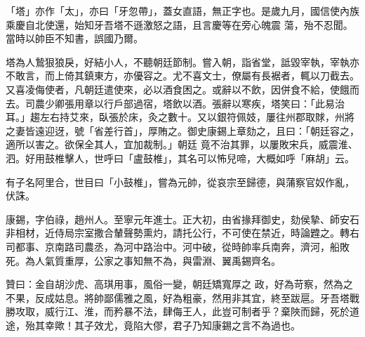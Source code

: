 \begin{pinyinscope}
 「塔」亦作「太」，亦曰「牙忽帶」，蓋女直語，無正字也。是歲九月，國信使內族乘慶自北使還，始知牙吾塔不遜激怒之語，且言慶等在旁心魄震
 蕩，殆不忍聞。當時以帥臣不知書，誤國乃爾。



 塔為人鷙狠狼戾，好結小人，不聽朝廷節制。嘗入朝，詣省堂，詆毀宰執，宰執亦不敢言，而上倚其鎮東方，亦優容之。尤不喜文士，僚屬有長裾者，輒以刀截去。又喜凌侮使者，凡朝廷遣使來，必以酒食困之。或辭以不飲，因併食不給，使餓而去。司農少卿張用章以行戶部過宿，塔飲以酒。張辭以寒疾，塔笑曰：「此易治耳。」趨左右持艾來，臥張於床，灸之數十。又以銀符佩妓，屢往州郡取賕，州將之妻皆遠迎迓，號「省差行首」，厚賄之。御史康錫上章劾之，且曰：「朝廷容之，適所以害之。欲保全其人，宜加裁制。」朝廷
 竟不治其罪，以屢敗宋兵，威震淮、泗。好用鼓椎擊人，世呼曰「盧鼓椎」，其名可以怖兒啼，大概如呼「麻胡」云。



 有子名阿里合，世目曰「小鼓椎」，嘗為元帥，從哀宗至歸德，與蒲察官奴作亂，伏誅。



 康錫，字伯祿，趙州人。至寧元年進士。正大初，由省掾拜御史，劾侯摯、師安石非相材，近侍局宗室撒合輦聲勢熏灼，請托公行，不可使在禁近，時論韙之。轉右司都事、京南路司農丞，為河中路治中。河中破，從時帥率兵南奔，濟河，船敗死。為人氣質重厚，公家之事知無不為，與雷淵、翼禹錫齊名。



 贊曰：金自胡沙虎、高琪用事，風俗一變，朝廷矯寬厚之
 政，好為苛察，然為之不果，反成姑息。將帥鄙儒雅之風，好為粗豪，然用非其宜，終至跋扈。牙吾塔戰勝攻取，威行江、淮，而矜暴不法，肆侮王人，此豈可制者乎？棄陜而歸，死於道途，殆其幸歟！其子效尤，竟陷大僇，君子乃知康錫之言不為過也。



\end{pinyinscope}